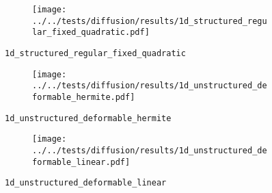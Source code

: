 %
%
\begin{frame}{}
  \vspace*{-0.2cm}
  \begin{figure}[h!]
    \begin{subfigure}[t]{0.5\textwidth}%
    \centering
    \end{subfigure}
    \begin{subfigure}[t]{0.48\textwidth}%
      \centering%
      \texttt{[image: ../../tests/diffusion/results/1d\_structured\_regular\_fixed\_quadratic.pdf]}%
    \end{subfigure}%
    \caption{\lstinline{1d_structured_regular_fixed_quadratic}}
  \end{figure} 
\end{frame}
%
%
\begin{frame}{}
  \vspace*{-0.2cm}
  \begin{figure}[h!]
    \begin{subfigure}[t]{0.5\textwidth}%
    \centering
    \end{subfigure}
    \begin{subfigure}[t]{0.48\textwidth}%
      \centering%
      \texttt{[image: ../../tests/diffusion/results/1d\_unstructured\_deformable\_hermite.pdf]}%
    \end{subfigure}%
    \caption{\lstinline{1d_unstructured_deformable_hermite}}
  \end{figure} 
\end{frame}
%
%
\begin{frame}{}
  \vspace*{-0.2cm}
  \begin{figure}[h!]
    \begin{subfigure}[t]{0.5\textwidth}%
    \centering
    \end{subfigure}
    \begin{subfigure}[t]{0.48\textwidth}%
      \centering%
      \texttt{[image: ../../tests/diffusion/results/1d\_unstructured\_deformable\_linear.pdf]}%
    \end{subfigure}%
    \caption{\lstinline{1d_unstructured_deformable_linear}}
  \end{figure} 
\end{frame}
